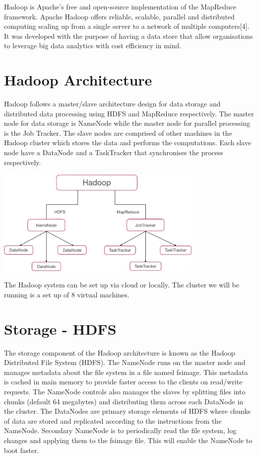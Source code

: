 \documentclass[11pt]{book}
\begin{document}
Hadoop is Apache's free and open-source implementation of the MapReduce framework. Apache Hadoop offers reliable, scalable, parallel and distributed computing scaling up from a single server to a network of multiple computers[4]. It was developed with the purpose of having a data store that allow organisations to leverage big data analytics with cost efficiency in mind.\\


\section{Hadoop Architecture}

Hadoop follows a master/slave architecture design for data storage and distributed data processing using HDFS and MapReduce respectively. The master node for data storage is NameNode while the master node for parallel processing is the Job Tracker. The slave nodes are comprised of other machines in the Hadoop cluster which stores the data and performs the computations. Each slave node have a DataNode and a TaskTracker that synchronises the process respectively. \\

\begin{center}
 \includegraphics[width=10cm]{hadoop}\\
 \end{center}

The Hadoop system can be set up via cloud or locally. The cluster we will be running is a set up of 8 virtual machines.

\section{Storage - HDFS}

The storage component of the Hadoop architecture is known as the Hadoop Distributed File System (HDFS). The NameNode runs on the master node and manages metadata about the file system in a file named fsimage. This metadata is cached in main memory to provide faster access to the clients on read/write requests. The NameNode controls also manages the slaves by splitting files into chunks (default 64 megabytes) and distributing them across each DataNode in the cluster. The DataNodes are primary storage elements of HDFS where chunks of data are stored and replicated according to the instructions from the NameNode. Secondary NameNode is to periodically read the file system, log changes and applying them to the fsimage file. This will enable the NameNode to boot faster.\\
\end{document}
